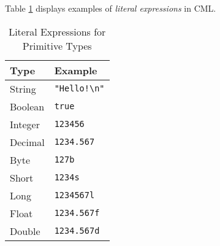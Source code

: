 Table \ref{tab:literal-expr-examples} displays examples of \emph{literal expressions}
in CML.

\begin{table}[H]
\centering
\begin{tabular}
{ l l }
\hline
Type & Example \\
\hline
String & \verb+"Hello!\n"+ \\
Boolean & \verb!true! \\
Integer & \verb!123456! \\
Decimal & \verb!1234.567! \\
Byte & \verb!127b! \\
Short & \verb!1234s! \\
Long & \verb!1234567l! \\
Float & \verb!1234.567f! \\
Double & \verb!1234.567d!
\end{tabular}
\caption{Literal Expressions for Primitive Types}
\label{tab:literal-expr-examples}
\end{table}
